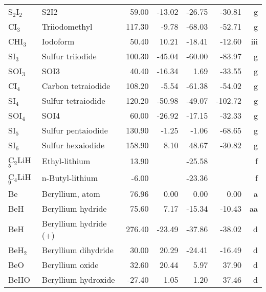 \begin{table}
\begin{center}
\begin{tabular}{llrrrrr}
 S$_2$I$_2$        & S2I2                            &    59.00    &   -13.02  &   -26.75  &   -30.81  &      g\\
 CI$_3$         & Triiodomethyl                   &   117.30    &    -9.78  &   -68.03  &   -52.71  &      g\\
 CHI$_3$        & Iodoform                        &    50.40    &    10.21  &   -18.41  &   -12.60  &    iii\\
 SI$_3$         & Sulfur triiodide                &   100.30    &   -45.04  &   -60.00  &   -83.97  &      g\\
 SOI$_3$        & SOI3                            &    40.40    &   -16.34  &     1.69  &   -33.55  &      g\\
 CI$_4$         & Carbon tetraiodide              &   108.20    &    -5.54  &   -61.38  &   -54.02  &      g\\
 SI$_4$         & Sulfur tetraiodide              &   120.20    &   -50.98  &   -49.07  &  -102.72  &      g\\
 SOI$_4$        & SOI4                            &    60.00    &   -26.92  &   -17.15  &   -32.33  &      g\\
 SI$_5$         & Sulfur pentaiodide              &   130.90    &    -1.25  &    -1.06  &   -68.65  &      g\\
 SI$_6$         & Sulfur hexaiodide               &   158.90    &     8.10  &    48.67  &   -30.82  &      g\\
 C$_2$LiH$_5$      & Ethyl-lithium                  &    13.90    &  &   -25.58  &  &      f\\
 C$_4$LiH$_9$      & n-Butyl-lithium                &    -6.00    &  &   -23.36  &  &      f\\
 Be          & Beryllium, atom                 &    76.96    &     0.00  &     0.00  &     0.00  &      a\\
 BeH         & Beryllium hydride               &    75.60    &     7.17  &   -15.34  &   -10.43  &     aa\\
 BeH         & Beryllium hydride (+)           &   276.40    &   -23.49  &   -37.86  &   -38.02  &      d\\
 BeH$_2$        & Beryllium dihydride             &    30.00    &    20.29  &   -24.41  &   -16.49  &      d\\
 BeO         & Beryllium oxide                 &    32.60    &    20.44  &     5.97  &    37.90  &      d\\
 BeHO        & Beryllium hydroxide             &   -27.40    &     1.05  &     1.20  &    37.46  &      d\\

\end{tabular}
\end{center}
\end{table}
